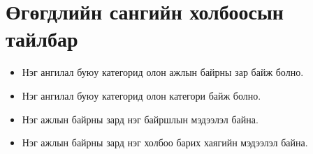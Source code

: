 \section{Өгөгдлийн сангийн холбоосын тайлбар}
\begin{itemize}
  \item Нэг ангилал буюу категорид олон ажлын байрны зар байж болно.
  \item Нэг ангилал буюу категорид олон категори байж болно. 
  \item Нэг ажлын байрны зард нэг байршлын мэдээлэл байна.
  \item Нэг ажлын байрны зард нэг холбоо барих хаягийн мэдээлэл байна.
\end{itemize}